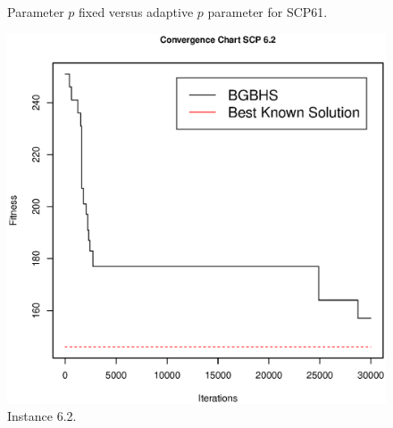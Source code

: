 \begin{figure}[htp] 
    \centering
    \hfill%
        \caption{Parameter $p$ fixed versus adaptive $p$ parameter for SCP61.}
         \label{fig:Instance.6.1}
\end{figure}

\begin{figure}[]
\centering
\includegraphics[scale=.45]{Resultados/scp62.eps}
\caption{Instance 6.2.}
\label{fig:Instance.6.2}
\end{figure}

